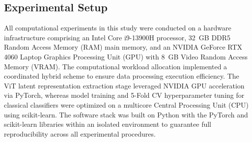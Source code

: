 \subsection{Experimental Setup}
\label{sec:experimental_setup}

All computational experiments in this study were conducted on a hardware infrastructure comprising an Intel Core i9-13900H processor, 32~GB DDR5 Random Access Memory (RAM) main memory, and an NVIDIA GeForce RTX 4060 Laptop Graphics Processing Unit (GPU) with 8~GB Video Random Access Memory (VRAM). The computational workload allocation implemented a coordinated hybrid scheme to ensure data processing execution efficiency. The ViT latent representation extraction stage leveraged NVIDIA GPU acceleration via PyTorch, whereas model training and 5-Fold CV hyperparameter tuning for classical classifiers were optimized on a multicore Central Processing Unit (CPU) using scikit-learn. The software stack was built on Python with the PyTorch and scikit-learn libraries within an isolated environment to guarantee full reproducibility across all experimental procedures.
